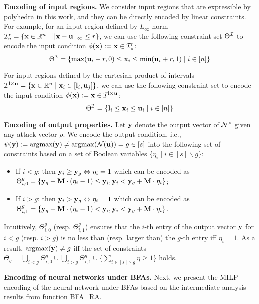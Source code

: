 \vspace{2mm}
\noindent
{\bf Encoding of input regions.}
We consider input regions that are expressible by polyhedra in this work, and they can be directly encoded by linear constraints. For example, for an input region defined by $L_\infty$-norm ${\mathcal{I}}^r_u=\{{\mathbf{x}}\in\mathbb{R}^n \mid || {\mathbf{x}}-{\mathbf{u}}||_\infty \le r\}$, we can use the following constraint set $\Theta^{\mathcal{I}}$ to encode the input condition $\phi({\mathbf{x}}):={\mathbf{x}}\in{\mathcal{I}}^r_{\mathbf{u}}$:
\[
\Theta^{\mathcal{I}}=\{ \text{max}({\mathbf{u}}_i-r,0)\le {\mathbf{x}}_i \le \text{min}({\mathbf{u}}_i+r,1) \mid i\in [n]\}
\]

For input regions defined by the cartesian product of intervals ${\mathcal{I}}^{{\mathbf{l}}\times{\mathbf{u}}}=\{{\mathbf{x}}\in \mathbb{R}^n\mid {\mathbf{x}}_i \in [{\mathbf{l}}_i, {\mathbf{u}}_j]\}$, we can use the following constraint set to encode the input condition $\phi({\mathbf{x}}):={\mathbf{x}}\in{\mathcal{I}}^{{\mathbf{l}}\times {\mathbf{u}}}$:
\[
\Theta^{\mathcal{I}}=\{ {\mathbf{l}}_i \le {\mathbf{x}}_i \le {\mathbf{u}}_i \mid i\in [n]\}
\]

\vspace{2mm}
\noindent
{\bf Encoding of output properties.}
Let ${\mathbf{y}}$ denote the output vector of ${\mathcal{N}}^\rho$ given any attack vector $\rho$. We encode the output condition, i.e., $\psi({\mathbf{y}}):=\text{argmax}({\mathbf{y}}) \neq \text{argmax}({\mathcal{N}}({\mathbf{u}}))=g\in[s]$ into the following set of constraints based on a set of Boolean variables $\{\eta_{i}\mid i\in[s]\backslash g\}$:
\begin{itemize}
    \item If $i<g$: then ${\mathbf{y}}_i\ge {\mathbf{y}}_g \Leftrightarrow \eta_i=1$ which can be encoded as 
    $\Theta_{i,0}^g=\{{\mathbf{y}}_g + \textbf{M}\cdot (\eta_i-1) \le {\mathbf{y}}_i, {\mathbf{y}}_i < {\mathbf{y}}_g + \textbf{M}\cdot \eta_i\}$;
    \item If $i> g$: then ${\mathbf{y}}_i> {\mathbf{y}}_g \Leftrightarrow \eta_i=1$ which can be encoded as 
    $\Theta_{i,1}^g=\{{\mathbf{y}}_g + \textbf{M}\cdot (\eta_i-1) < {\mathbf{y}}_i, {\mathbf{y}}_i < {\mathbf{y}}_g + \textbf{M}\cdot \eta_i\}$.
\end{itemize}
Intuitively, $\Theta_{i,0}^g$ (resp. $\Theta_{i,1}^g$) ensures that the $i$-th entry of the output vector ${\mathbf{y}}$ for $i<g$ (resp. $i>g$) is no less than (resp. larger than) the $g$-th entry iff $\eta_i=1$. As a result, $\text{argmax}({\mathbf{y}})\neq g$ iff the set of constraints $\Theta_g=\bigcup_{i<g}\Theta^g_{i,0} \cup \bigcup_{i>g}\Theta^g_{i,1}\cup\{\sum_{i\in[s]\backslash g} \eta \ge 1\}$ holds.

\vspace{2mm}
\noindent
{\bf Encoding of neural networks under BFAs.} 
Next, we present the MILP encoding of the neural network under BFAs based on the intermediate analysis results from function {\sf BFA\_RA}. 

